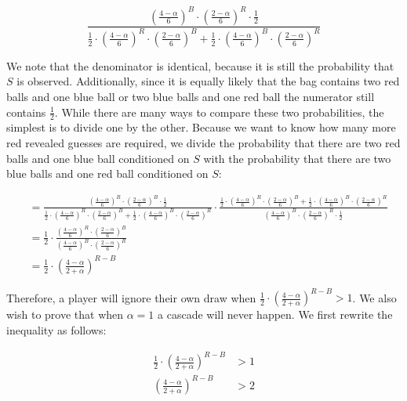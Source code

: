 \documentclass[12pt]{article}%
\begin{document}
\begin{equation}
\frac{(\frac{4 - \alpha}{6})^{B} \cdot (\frac{2 - \alpha}{6})^R \cdot \frac{1}{2}}{\frac{1}{2} \cdot (\frac{4 - \alpha}{6})^R \cdot (\frac{2 - \alpha}{6})^B + \frac{1}{2} \cdot (\frac{4 - \alpha}{6})^B \cdot (\frac{2 - \alpha}{6})^R}
\end{equation}

We note that the denominator is identical, because it is still the probability that $S$ is observed. Additionally, since it is equally likely that the bag contains two red balls and one blue ball or two blue balls and one red ball the numerator still contains $\frac{1}{2}$. While there are many ways to compare these two probabilities, the simplest is to divide one by the other. Because we want to know how many more red revealed guesses are required, we divide the probability that there are two red balls and one blue ball conditioned on $S$ with the probability that there are two blue balls and one red ball conditioned on $S$:

\begin{equation}
\begin{split}
&= \frac{(\frac{4 - \alpha}{6})^R \cdot (\frac{2 - \alpha}{6})^B \cdot \frac{1}{2}}{\frac{1}{2} \cdot (\frac{4 - \alpha}{6})^R \cdot (\frac{2 - \alpha}{6})^B + \frac{1}{2} \cdot (\frac{4 - \alpha}{6})^B \cdot (\frac{2 - \alpha}{6})^R} \cdot \frac{\frac{1}{2} \cdot (\frac{4 - \alpha}{6})^R \cdot (\frac{2 - \alpha}{6})^B + \frac{1}{2} \cdot (\frac{4 - \alpha}{6})^B \cdot (\frac{2 - \alpha}{6})^R}{(\frac{4 - \alpha}{6})^{B} \cdot (\frac{2 - \alpha}{6})^R \cdot \frac{1}{2}}\\
&= \frac{1}{2} \cdot \frac{(\frac{4 - \alpha}{6})^R \cdot (\frac{2 - \alpha}{6})^B}{(\frac{4 - \alpha}{6})^B \cdot (\frac{2 - \alpha}{6})^R}\\
&= \frac{1}{2} \cdot (\frac{4 - \alpha}{2 + \alpha})^{R - B}
\end{split}
\end{equation}

Therefore, a player will ignore their own draw when $\frac{1}{2} \cdot (\frac{4 - \alpha}{2 + \alpha})^{R - B} > 1$. We also wish to prove that when $\alpha = 1$ a cascade will never happen. We first rewrite the inequality as follows:

\begin{equation}
\begin{split}
\frac{1}{2} \cdot (\frac{4 - \alpha}{2 + \alpha})^{R - B} &> 1\\
(\frac{4 - \alpha}{2 + \alpha})^{R - B} &> 2
\end{split}
\end{equation}
\end{document}
